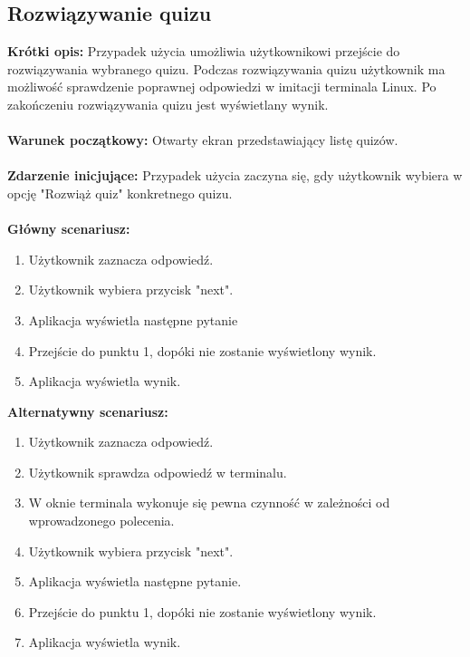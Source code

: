 \documentclass[10pt,a4paper]{report}
\begin{document}
\begin{adjustwidth}{2cm}{2cm}
\subsection{Rozwiązywanie quizu}
\begin{minipage}{1\linewidth}
\textbf{Krótki opis:} Przypadek użycia umożliwia użytkownikowi przejście do rozwiązywania wybranego quizu. Podczas rozwiązywania quizu użytkownik ma możliwość sprawdzenie poprawnej odpowiedzi w imitacji terminala Linux. Po zakończeniu rozwiązywania quizu jest wyświetlany wynik. \\ \\
\textbf{Warunek początkowy:} Otwarty ekran przedstawiający listę quizów.\\ \\
\textbf{Zdarzenie inicjujące:} Przypadek użycia zaczyna się, gdy użytkownik wybiera w opcję "Rozwiąż quiz" konkretnego quizu. \\ \\
\textbf{Główny scenariusz:} 
\begin{enumerate}
\setlength\itemsep{0.2cm}
    \item Użytkownik zaznacza odpowiedź.
    \item Użytkownik wybiera przycisk "next".
    \item Aplikacja wyświetla następne pytanie
    \item Przejście do punktu 1, dopóki nie zostanie wyświetlony wynik.
    \item Aplikacja wyświetla wynik. \\
\end{enumerate}
\textbf{Alternatywny scenariusz:} 
\begin{enumerate}
\setlength\itemsep{0.2cm}
    \item Użytkownik zaznacza odpowiedź.
    \item Użytkownik sprawdza odpowiedź w terminalu.
    \item W oknie terminala wykonuje się pewna czynność w zależności od wprowadzonego polecenia.
    \item Użytkownik wybiera przycisk "next".
    \item Aplikacja wyświetla następne pytanie.
    \item Przejście do punktu 1, dopóki nie zostanie wyświetlony wynik.
    \item Aplikacja wyświetla wynik.
\end{enumerate}
\end{minipage}

\end{adjustwidth}
\end{document}
